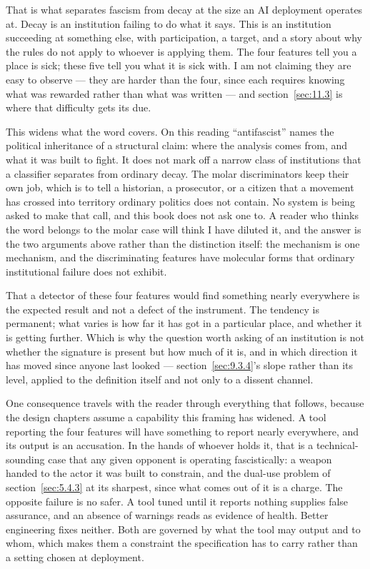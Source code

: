 That is what separates fascism from decay at the size an AI deployment operates at. Decay is an institution failing to do what it says. This is an institution succeeding at something else, with participation, a target, and a story about why the rules do not apply to whoever is applying them. The four features tell you a place is sick; these five tell you what it is sick with. I am not claiming they are easy to observe — they are harder than the four, since each requires knowing what was rewarded rather than what was written — and section~\ref{sec:11.3} is where that difficulty gets its due.

This widens what the word covers. On this reading “antifascist” names the political inheritance of a structural claim: where the analysis comes from, and what it was built to fight. It does not mark off a narrow class of institutions that a classifier separates from ordinary decay. The molar discriminators keep their own job, which is to tell a historian, a prosecutor, or a citizen that a movement has crossed into territory ordinary politics does not contain. No system is being asked to make that call, and this book does not ask one to. A reader who thinks the word belongs to the molar case will think I have diluted it, and the answer is the two arguments above rather than the distinction itself: the mechanism is one mechanism, and the discriminating features have molecular forms that ordinary institutional failure does not exhibit.

That a detector of these four features would find something nearly everywhere is the expected result and not a defect of the instrument. The tendency is permanent; what varies is how far it has got in a particular place, and whether it is getting further. Which is why the question worth asking of an institution is not whether the signature is present but how much of it is, and in which direction it has moved since anyone last looked — section~\ref{sec:9.3.4}'s slope rather than its level, applied to the definition itself and not only to a dissent channel.

One consequence travels with the reader through everything that follows, because the design chapters assume a capability this framing has widened. A tool reporting the four features will have something to report nearly everywhere, and its output is an accusation. In the hands of whoever holds it, that is a technical-sounding case that any given opponent is operating fascistically: a weapon handed to the actor it was built to constrain, and the dual-use problem of section~\ref{sec:5.4.3} at its sharpest, since what comes out of it is a charge. The opposite failure is no safer. A tool tuned until it reports nothing supplies false assurance, and an absence of warnings reads as evidence of health. Better engineering fixes neither. Both are governed by what the tool may output and to whom, which makes them a constraint the specification has to carry rather than a setting chosen at deployment.

